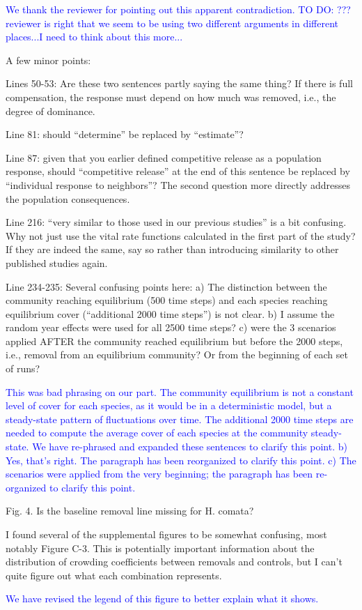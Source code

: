 \documentclass[12pt]{article}
\newcommand{\response}{\textcolor{blue}}
\begin{document}
\response{We thank the reviewer for pointing out this apparent contradiction. TO DO: ??? reviewer is right
that we seem to be using two different arguments in different places...I need to think about this more...}

A few minor points:

Lines 50-53: Are these two sentences partly saying the same thing? If there is full compensation, the
response must depend on how much was removed, i.e., the degree of dominance.

Line 81: should “determine” be replaced by “estimate”?

Line 87: given that you earlier defined competitive release as a population response, should
“competitive release” at the end of this sentence be replaced by “individual response to neighbors”?
The second question more directly addresses the population consequences.

Line 216: “very similar to those used in our previous studies” is a bit confusing. Why not just use the
vital rate functions calculated in the first part of the study? If they are indeed the same, say so rather
than introducing similarity to other published studies again.

Line 234-235: Several confusing points here: a) The distinction between the community reaching
equilibrium (500 time steps) and each species reaching equilibrium cover (“additional 2000 time steps”)
is not clear. b) I assume the random year effects were used for all 2500 time steps? c) were the 3
scenarios applied AFTER the community reached equilibrium but before the 2000 steps, i.e., removal
from an equilibrium community? Or from the beginning of each set of runs?

\response{ This was bad phrasing on our part. 
The community equilibrium is not a constant level of cover for each species, as it would be in a deterministic
model, but a steady-state pattern of fluctuations over time. The additional 2000 time steps are needed to compute the average cover of each species
at the community steady-state. We have re-phrased and expanded these sentences to clarify this point. b) Yes, that's right. The paragraph
has been reorganized to clarify this point. c) The scenarios were applied from the very beginning; the paragraph has been re-organized to 
clarify this point.}

Fig. 4. Is the baseline removal line missing for H. comata?

I found several of the supplemental figures to be somewhat confusing, most notably Figure C-3. This is
potentially important information about the distribution of crowding coefficients between removals and
controls, but I can’t quite figure out what each combination represents.

\response{We have revised the legend of this figure to better explain what it shows.}
\end{document}
